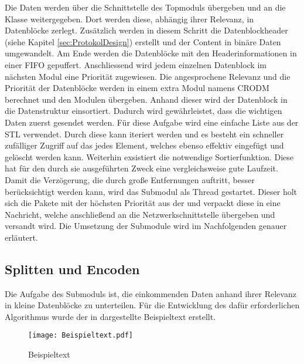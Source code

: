 Die Daten werden {\"u}ber die Schnittstelle des Topmoduls {\"u}bergeben und an die
Klasse  weitergegeben. Dort werden diese, abh{\"a}ngig
ihrer Relevanz, in Datenbl{\"o}cke zerlegt. Zus{\"a}tzlich werden in diesem
Schritt die Datenblockheader (siehe Kapitel \ref{sec:ProtokolDesign}) erstellt und der
Content in bin{\"a}re Daten umgewandelt. Am Ende werden die Datenbl{\"o}cke mit den
Headerinformationen in einer \gls{FIFO} gepuffert.
Anschliessend wird jedem einzelnen Datenblock im n{\"a}chsten Modul eine Priorit{\"a}t zugewiesen. Die angesprochene
Relevanz und die Priorit{\"a}t der Datenbl{\"o}cke werden in einem extra Modul namens
\gls{CRODM} berechnet und den Modulen {\"u}bergeben.
Anhand dieser wird der Datenblock in die Datenstruktur
 einsortiert. Dadurch wird
gew{\"a}hrleistet, dass die wichtigen Daten zuerst gesendet werden. F{\"u}r diese
Aufgabe wird eine einfache Liste aus der \gls{STL} verwendet. Durch diese kann
iteriert werden und es besteht ein schneller zufälliger Zugriff auf das jedes
Element, welches ebenso effektiv eingefügt und gelöscht werden kann. Weiterhin
exsistiert die notwendige Sortierfunktion. Diese hat f{\"u}r den durch sie
ausgef{\"u}hrten Zweck eine vergleichsweise gute Laufzeit.
Damit die Verz{\"o}gerung, die durch gro{\ss}e Entfernungen auftritt, besser
ber{\"u}cksichtigt werden kann, wird das Submodul  als Thread
gestartet.
Dieser holt sich die Pakete mit der h{\"o}chsten Priorit{\"a}t aus der
 und verpackt diese in eine Nachricht, welche
anschlie{\ss}end an die Netzwerkschnittstelle {\"u}bergeben und versandt wird.
\newline Die Umsetzung der Submodule wird im Nachfolgenden genauer
erl{\"a}utert.

\subsection{Splitten und Encoden}

Die Aufgabe des Submoduls  ist, die einkommenden Daten
anhand ihrer Relevanz in kleine Datenbl{\"o}cke zu unterteilen. F{\"u}r die Entwicklung
des daf{\"u}r erforderlichen Algorithmus wurde der in 
dargestellte Beispieltext erstellt.

\begin{figure}[H]
	\centering
	\texttt{[image: Beispieltext.pdf]}
	\caption{Beispieltext}
	\label{fig:Beispieltext}
\end{figure}

